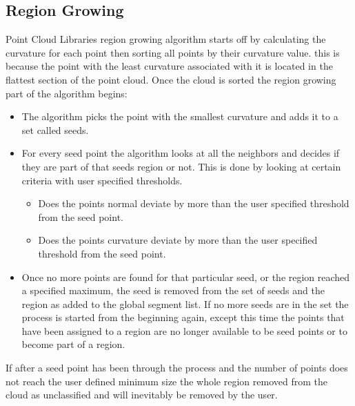  


				
	\subsection{Region Growing}
	
		Point Cloud Libraries region growing algorithm starts off by calculating the curvature for each point then sorting all points by their curvature value. this is because the point with the least curvature associated with it is located in the flattest section of the point cloud. Once the cloud is sorted the region growing part of the algorithm begins:
		
		\begin{itemize}
			\item The algorithm picks the point with the smallest curvature and adds it to a set called seeds.
			
			\item For every seed point the algorithm looks at all the neighbors and decides if they are part of that seeds region or not. This is done by looking at certain criteria with user specified thresholds.
			
			\begin{itemize}
				\item Does the points normal deviate by more than the user specified threshold from the seed point.
				
				\item Does the points curvature deviate by more than the user specified threshold from the seed point.
				
			\end{itemize}
			
			\item Once no more points are found for that particular seed, or the region reached a specified maximum, the seed is removed from the set of seeds and the region as added to the global segment list. If no more seeds are in the set the process is started from the beginning again, except this time the points that have been assigned to a region are no longer available to be seed points or to become part of a region.
			
		\end{itemize}
		
		If after a seed point has been through the process and the number of points does not reach the user defined minimum size the whole region removed from the cloud as unclassified and will inevitably be removed by the user.
		
